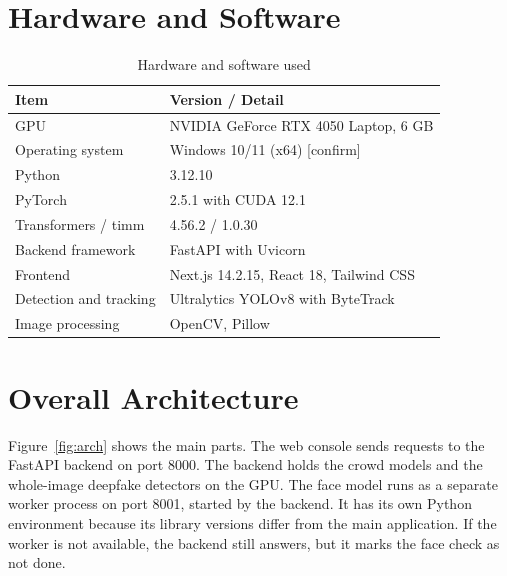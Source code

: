 \documentclass[12pt,a4paper,oneside]{report}
\begin{document}
\section{Hardware and Software}
\begin{table}[H]
\centering
\caption{Hardware and software used}\label{tab:env}
\begin{tabular}{@{}ll@{}}
\toprule
Item & Version / Detail \\
\midrule
GPU & NVIDIA GeForce RTX 4050 Laptop, 6 GB \\
Operating system & Windows 10/11 (x64) [confirm] \\
Python & 3.12.10 \\
PyTorch & 2.5.1 with CUDA 12.1 \\
Transformers / timm & 4.56.2 / 1.0.30 \\
Backend framework & FastAPI with Uvicorn\cite{fastapi} \\
Frontend & Next.js 14.2.15, React 18, Tailwind CSS\cite{nextjs} \\
Detection and tracking & Ultralytics YOLOv8\cite{jocher2023} with ByteTrack \\
Image processing & OpenCV\cite{bradski2000}, Pillow \\
\bottomrule
\end{tabular}
\end{table}

\section{Overall Architecture}
Figure~\ref{fig:arch} shows the main parts. The web console sends requests to the FastAPI backend on port 8000. The backend holds the crowd models and the whole-image deepfake detectors on the GPU. The face model runs as a separate worker process on port 8001, started by the backend. It has its own Python environment because its library versions differ from the main application. If the worker is not available, the backend still answers, but it marks the face check as not done.
\end{document}
